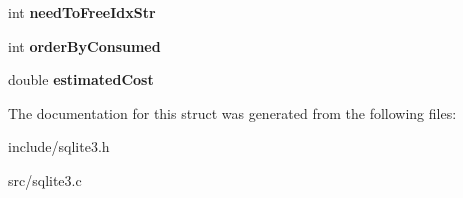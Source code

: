 \begin{DoxyCompactItemize}
\item 
\hypertarget{structsqlite3__index__info_a5410066c067c3891cdf165c70cc4d6b1}{int {\bfseries need\-To\-Free\-Idx\-Str}}\label{structsqlite3__index__info_a5410066c067c3891cdf165c70cc4d6b1}

\item 
\hypertarget{structsqlite3__index__info_a5515d9de0f37f68d7e0930c20a668b29}{int {\bfseries order\-By\-Consumed}}\label{structsqlite3__index__info_a5515d9de0f37f68d7e0930c20a668b29}

\item 
\hypertarget{structsqlite3__index__info_aa8b4fe1d2ee38aab57ba5e1da00d7830}{double {\bfseries estimated\-Cost}}\label{structsqlite3__index__info_aa8b4fe1d2ee38aab57ba5e1da00d7830}

\end{DoxyCompactItemize}


The documentation for this struct was generated from the following files\-:\begin{DoxyCompactItemize}
\item 
include/sqlite3.\-h\item 
src/sqlite3.\-c\end{DoxyCompactItemize}

